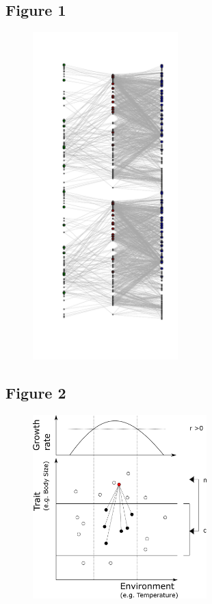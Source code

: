 \documentclass[12pt]{article}
\begin{document}
\newpage

\subsection*{Figure 1}

\begin{figure}[ht!]
\centering\includegraphics[width=0.5\textwidth]{figures/metaweb_sampling}
\end{figure}

\newpage

\subsection*{Figure 2}

\begin{figure}[ht!]
\centering\includegraphics[width=0.6\textwidth]{figures/integrated_niche}
\end{figure}
\end{document}
